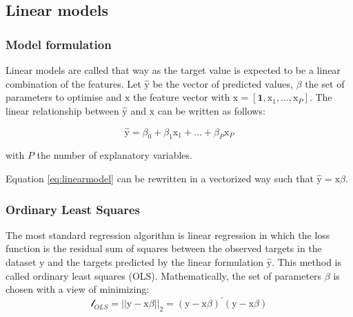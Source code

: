 \documentclass[
]{book}
\begin{document}
\hypertarget{linear-models}{%
\subsection{Linear models}\label{linear-models}}

\hypertarget{model-formulation}{%
\subsubsection*{Model formulation}\label{model-formulation}}

Linear models are called that way as the target value is expected to be a linear combination of the features. Let \(\hat{\mathrm{y}}\) be the vector of predicted values, \(\beta\) the set of parameters to optimise and \(\pmb{\mathrm{x}}\) the feature vector with \(\pmb{\mathrm{x}} = [\pmb{1}, \mathrm{x}_1, \dots, \mathrm{x}_P]\). The linear relationship between \(\hat{\mathrm{y}}\) and \(\pmb{\mathrm{x}}\) can be written as follows:

\begin{equation}
  \hat{\mathrm{y}} = \beta_0 + \beta_1 \mathrm{x}_1 + \dots + \beta_P \mathrm{x}_P
  \label{eq:linearmodel}
\end{equation}

with \(P\) the number of explanatory variables.

Equation \eqref{eq:linearmodel} can be rewritten in a vectorized way such that \(\hat{\mathrm{y}} = \pmb{\mathrm{x}}\beta\).

\hypertarget{ordinary-least-squares}{%
\subsubsection*{Ordinary Least Squares}\label{ordinary-least-squares}}

The most standard regression algorithm is linear regression in which the loss function is the residual sum of squares between the observed targets in the dataset \(\mathrm{y}\) and the targets predicted by the linear formulation \(\hat{\mathrm{y}}\). This method is called ordinary least squares (OLS). Mathematically, the set of parameters \(\beta\) is chosen with a view of minimizing:
\begin{equation}
  \mathcal{l}_{OLS} = ||\mathrm{y} - \pmb{\mathrm{x}}\beta||_2 = (\mathrm{y} - \pmb{\mathrm{x}}\beta)^{'}(\mathrm{y} - \pmb{\mathrm{x}}\beta)
  \label{eq:ols}
\end{equation}
\end{document}
